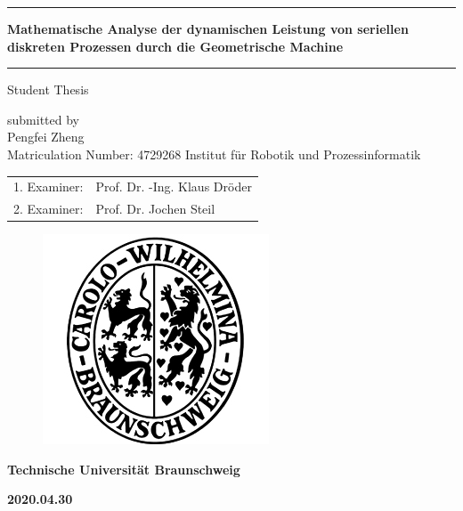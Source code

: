 \documentclass[ifn,english,masterarbeit,pdf,cd]{report}
\begin{document}
\large {}
\begin{titlepage}
    \setcounter{page}{1}
    \let\footnotesize\small
    \let\footnoterule\relax
    \headsep 1.5cm
    \vskip -2cm
    \begin{center}
    	\rule[1\baselineskip]{\textwidth}{1pt}
    	\LARGE\bf Mathematische Analyse der dynamischen Leistung von seriellen diskreten Prozessen durch die Geometrische Machine
    	\baselineskip
    	\rule[1\baselineskip]{\textwidth}{1pt}
    \end{center}   
    \begin{center}        
               {\Large{Student Thesis\\}\par}
                \vskip 0.25cm
                {\large submitted by\\}
                \vskip 0.25cm
                {\Large Pengfei Zheng\\ \large Matriculation Number: 4729268}
                \vskip 0.8cm
                {\large Institut f\"{u}r Robotik und Prozessinformatik}                       
    \end{center}
\linespread{1.5}
\begin{table}[!h]
	\centering	
	\begin{tabular}{rl}
		\large	1. Examiner:& \large Prof. Dr. -Ing. Klaus Dr\"{o}der \\
		\large2. Examiner:& \large Prof. Dr. Jochen Steil \\
	\end{tabular}
\end{table}
    \begin{figure}[!h]
        \begin{center}
            \includegraphics[width=0.3\linewidth]{carolo.jpg}
        \end{center}
    \end{figure}
\centerline{\large\bf Technische Universit\"{a}t Braunschweig}
\vskip 1cm
\centerline{\large\bf 2020.04.30}

\end{titlepage}
\end{document}
